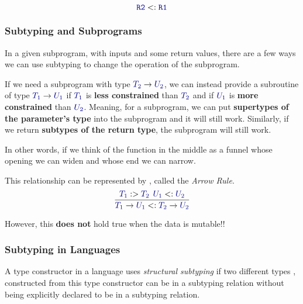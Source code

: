 \begin{equation*}
  \mathtt{\SemanticType{R2}} <: \mathtt{\SemanticType{R1}}
\end{equation*}

\subsubsection{Subtyping and Subprograms}\label{subsubsec:Subtyping_and_Subprograms}
In a given subprogram, with  inputs and some return values, there are a few ways we can use subtyping to change the operation of the subprogram.

If we need a subprogram with type $\SemanticType{T_{2}} \rightarrow \SemanticType{U_{2}}$, we can instead provide a subroutine of type $\SemanticType{T_{1}} \rightarrow \SemanticType{U_{1}}$ if $\SemanticType{T_1}$ is \textbf{less constrained} than $\SemanticType{T_{2}}$ and if $\SemanticType{U_{1}}$ is \textbf{more constrained} than $\SemanticType{U_{2}}$.
Meaning, for a subprogram, we can put \textbf{supertypes of the parameter's type} into the subprogram and it will still work.
Similarly, if we return \textbf{subtypes of the return type}, the subprogram will still work.

In other words, if we think of the function in the middle as a funnel whose opening we can widen and whose end we can narrow.

This relationship can be represented by , called the \emph{Arrow Rule}.
\begin{equation}\label{eq:Arrow_Rule}
  \dfrac{\SemanticType{T_{1}} :> \SemanticType{T_{2}} \:\: \SemanticType{U_{1}} <: \SemanticType{U_{2}}}{\SemanticType{T_{1}} \rightarrow \SemanticType{U_{1}} <: \SemanticType{T_{2}} \rightarrow \SemanticType{U_{2}}}
\end{equation}

\begin{remark*}
  However, this \textbf{does not} hold true when the data is mutable!!
\end{remark*}

\subsubsection{Subtyping in Languages}\label{subsubsec:Subtyping_in_Languages}
\begin{definition}\label{def:Structural_Subtyping}
  A type constructor in a language uses \emph{structural subtyping} if two different types ,  constructed from this type constructor can be in a subtyping relation without being explicitly declared to be in a subtyping relation.
\end{definition}

